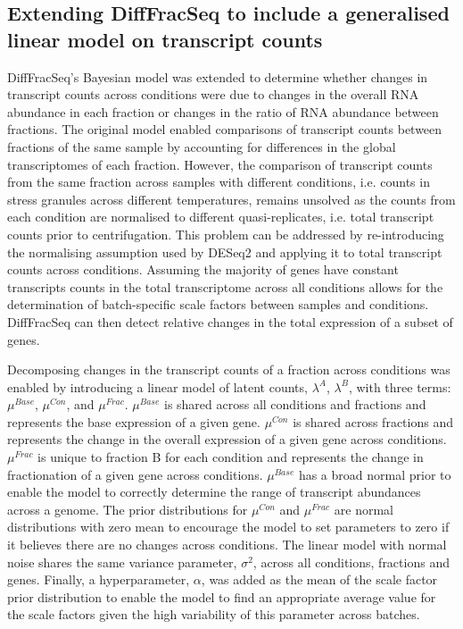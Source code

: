 \documentclass[../main.tex]{subfiles}
\begin{document}
\subsection{Extending DiffFracSeq to include a generalised linear model on transcript counts}

DiffFracSeq's Bayesian model was extended to determine whether changes in transcript counts across conditions were due to changes in the overall RNA abundance in each fraction or changes in the ratio of RNA abundance between fractions.   
The original model enabled comparisons of transcript counts between fractions of the same sample by accounting for differences in the global transcriptomes of each fraction.
However, the comparison of transcript counts from the same fraction across samples with different conditions, i.e. counts in stress granules across different temperatures, remains unsolved as the counts from each condition are normalised to different quasi-replicates, i.e. total transcript counts prior to centrifugation.
This problem can be addressed by re-introducing the normalising assumption used by DESeq2 and applying it to total transcript counts across conditions.
Assuming the majority of genes have constant transcripts counts in the total transcriptome across all conditions allows for the determination of batch-specific scale factors between samples and conditions.
DiffFracSeq can then detect relative changes in the total expression of a subset of genes.

Decomposing changes in the transcript counts of a fraction across conditions was enabled by introducing a linear model of latent counts, $\lambda^A$, $\lambda^B$, with three terms: $\mu^{Base}$, $\mu^{Con}$, and $\mu^{Frac}$.
$\mu^{Base}$ is shared across all conditions and fractions and represents the base expression of a given gene.
$\mu^{Con}$ is shared across fractions and represents the change in the overall expression of a given gene across conditions.
$\mu^{Frac}$ is unique to fraction B for each condition and represents the change in fractionation of a given gene across conditions.
$\mu^{Base}$ has a broad normal prior to enable the model to correctly determine the range of transcript abundances across a genome.
The prior distributions for $\mu^{Con}$ and $\mu^{Frac}$ are normal distributions with zero mean to encourage the model to set parameters to zero if it believes there are no changes across conditions.
The linear model with normal noise shares the same variance parameter, $\sigma^2$, across all conditions, fractions and genes.
Finally, a hyperparameter, $\alpha$, was added as the mean of the scale factor prior distribution to enable the model to find an appropriate average value for the scale factors given the high variability of this parameter across batches.
\end{document}
